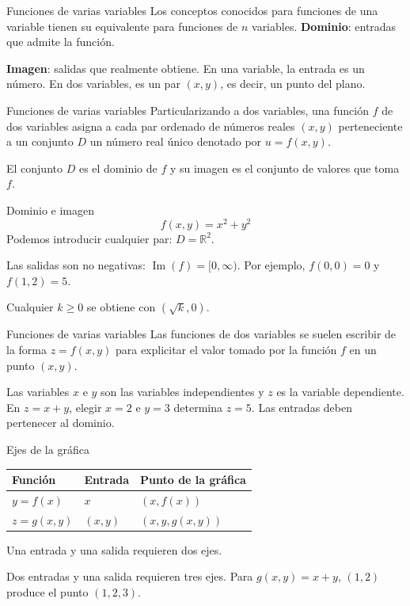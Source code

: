 \begin{frame}{Funciones de varias variables}
Los conceptos conocidos para funciones de una variable tienen su equivalente para funciones de $n$ variables.
\medskip
\textbf{Dominio}: entradas que admite la función.

\textbf{Imagen}: salidas que realmente obtiene.
\medskip
En una variable, la entrada es un número. En dos variables, es un par $(x,y)$, es decir, un punto del plano.
\end{frame}
\begin{frame}{Funciones de varias variables}
Particularizando a dos variables, una función $f$ de dos variables asigna a cada par ordenado de números reales $(x,y)$ perteneciente a un conjunto $D$ un número real único denotado por $u=f(x,y)$.
\medskip

El conjunto $D$ es el dominio de $f$ y su imagen es el conjunto de valores que toma $f$.
\end{frame}
\begin{frame}{Dominio e imagen}
\[f(x,y)=x^2+y^2\]
Podemos introducir cualquier par: $D=\mathbb R^2$.

Las salidas son no negativas: $\operatorname{Im}(f)=[0,\infty)$.
\medskip
Por ejemplo, $f(0,0)=0$ y $f(1,2)=5$.

Cualquier $k\ge0$ se obtiene con $(\sqrt k,0)$.
\end{frame}
\begin{frame}{Funciones de varias variables}
Las funciones de dos variables se suelen escribir de la forma $z=f(x,y)$ para explicitar el valor tomado por la función $f$ en un punto $(x,y)$.
\medskip

Las variables $x$ e $y$ son las variables independientes y $z$ es la variable dependiente.
\medskip
En $z=x+y$, elegir $x=2$ e $y=3$ determina $z=5$. Las entradas deben pertenecer al dominio.
\end{frame}
\begin{frame}{Ejes de la gráfica}
\begin{center}\begin{tabular}{lll}
Función & Entrada & Punto de la gráfica\\\hline
$y=f(x)$ & $x$ & $(x,f(x))$\\[3mm]
$z=g(x,y)$ & $(x,y)$ & $(x,y,g(x,y))$
\end{tabular}\end{center}
Una entrada y una salida requieren dos ejes.

Dos entradas y una salida requieren tres ejes.
\medskip
Para $g(x,y)=x+y$, $(1,2)$ produce el punto $(1,2,3)$.
\end{frame}
